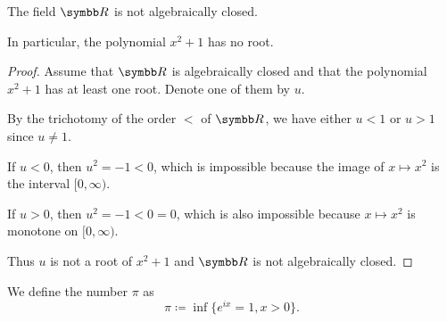 \begin{proposition}\label{thm:reals_not_algebraically_closed}
  The field \( \R \) is not algebraically closed.

  In particular, the polynomial \( x^2 + 1 \) has no root.
\end{proposition}
\begin{proof}
  Assume that \( \R \) is algebraically closed and that the polynomial \( x^2 + 1 \) has at least one root. Denote one of them by \( u \).

  By the trichotomy of the order \( < \) of \( \R \), we have either \( u < 1 \) or \( u > 1 \) since \( u \neq 1 \).

  If \( u < 0 \), then \( u^2 = -1 < 0 \), which is impossible because the image of \( x \mapsto x^2 \) is the interval \( [0, \infty) \).

  If \( u > 0 \), then \( u^2 = -1 < 0 = 0 \), which is also impossible because \( x \mapsto x^2 \) is monotone on \( [0, \infty) \).

  Thus \( u \) is not a root of \( x^2 + 1 \) and \( \R \) is not algebraically closed.
\end{proof}

\begin{definition}\label{def:pi}\cite[515]{Knapp2016BAlg}
  We define the number \( \pi \) as
  \begin{equation*}
    \pi \coloneqq \inf\{ e^{ix} = 1, x > 0 \}.
  \end{equation*}
\end{definition}
